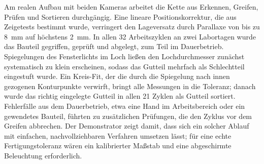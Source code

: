 Am realen Aufbau mit beiden Kameras arbeitet die Kette aus Erkennen, Greifen, Prüfen und
Sortieren durchgängig. Eine lineare Positionskorrektur, die aus Zeigetests bestimmt wurde,
verringert den Lageversatz durch Parallaxe von bis zu \SI{8}{\milli\metre} auf höchstens
\SI{2}{\milli\metre}. In allen 32 Arbeitszyklen an zwei Labortagen wurde das Bauteil gegriffen,
geprüft und abgelegt, zum Teil im Dauerbetrieb. Spiegelungen des Fensterlichts im Loch ließen den
Lochdurchmesser zunächst systematisch zu klein erscheinen, sodass das Gutteil mehrfach als
Schlechtteil eingestuft wurde. Ein Kreis-Fit, der die durch die Spiegelung nach innen gezogenen
Konturpunkte verwirft, bringt alle Messungen in die Toleranz; danach wurde das richtig
eingelegte Gutteil in allen 21 Zyklen als Gutteil sortiert. Fehlerfälle aus dem Dauerbetrieb,
etwa eine Hand im Arbeitsbereich oder ein gewendetes Bauteil, führten zu zusätzlichen Prüfungen,
die den Zyklus vor dem Greifen abbrechen.
Der Demonstrator zeigt damit, dass sich ein solcher Ablauf mit einfachen, nachvollziehbaren
Verfahren umsetzen lässt; für eine echte Fertigungstoleranz wären ein kalibrierter Maßstab und
eine abgeschirmte Beleuchtung erforderlich.
